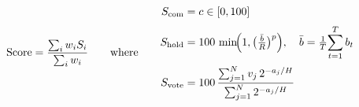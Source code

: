 \documentclass[border=10pt,preview]{standalone}
\begin{document}
\[
\text{Score}=\frac{\sum_{i} w_i S_i}{\sum_{i} w_i}
\qquad\text{where}\qquad
\begin{aligned}
S_{\text{com}} &= c \in [0,100]\\[2pt]
S_{\text{hold}} &= 100\,\min\!\Bigl(1,\bigl(\tfrac{\bar{b}}{R}\bigr)^{p}\Bigr),
   \quad \bar{b}=\tfrac{1}{T}\!\sum_{t=1}^{T} b_t\\[2pt]
S_{\text{vote}} &= 100\,\frac{\sum_{j=1}^{N} v_j\,2^{-a_j/H}}{\sum_{j=1}^{N} 2^{-a_j/H}}
\end{aligned}
\]
\end{document}
